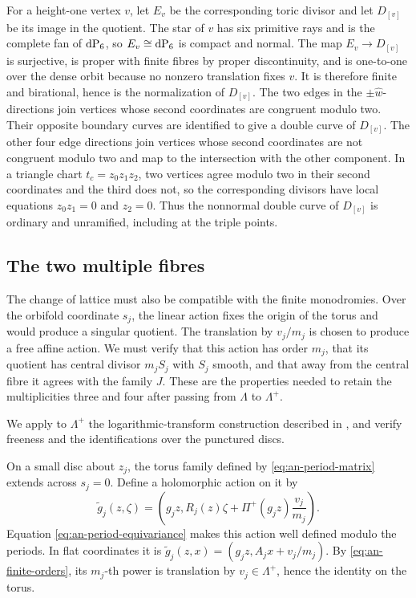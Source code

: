 For a height-one vertex $v$, let $E_v$
be the corresponding toric divisor and let $D_{[v]}$ be its image in the
quotient.  The star of $v$ has six primitive rays and is the complete fan
of $\operatorname{dP}_6$, so $E_v\cong\operatorname{dP}_6$ is compact and normal.  The map
$E_v\to D_{[v]}$ is surjective, is proper with finite fibres by proper
discontinuity, and is one-to-one over the dense orbit because no nonzero
translation fixes $v$.  It is therefore finite and birational, hence is
the normalization of $D_{[v]}$.  The two edges in the
$\pm\widehat w$-directions join vertices whose second coordinates are
congruent modulo two.  Their opposite boundary curves are identified to give
a double curve of $D_{[v]}$.  The other four edge directions join vertices
whose second coordinates are not congruent modulo two and map to the
intersection with the other component.  In a
triangle chart $t_c=z_0z_1z_2$, two vertices agree modulo two in their
second coordinates and the third does not, so the corresponding divisors
have local equations
$z_0z_1=0$ and $z_2=0$.  Thus the nonnormal double curve of
$D_{[v]}$ is ordinary and unramified, including at the triple points.

\subsection{The two multiple fibres}

The change of lattice must also be compatible with the finite monodromies.
Over the orbifold coordinate $s_j$, the linear action fixes the origin of
the torus and would produce a singular quotient.  The translation by
$v_j/m_j$ is chosen to produce a free affine action.  We must verify that this
action has order $m_j$, that its quotient has central divisor $m_jS_j$
with $S_j$ smooth, and that away from the central fibre it agrees with the
family $J$.  These are the properties needed to retain the multiplicities
three and four after passing from $\Lambda$ to $\Lambda^+$.

We apply to $\Lambda^+$ the logarithmic-transform construction described in
\citep[Definition~5.3 and Theorem~5.4]{Alpoge2026}, and verify freeness and
the identifications over the punctured discs.

On a small disc about $z_j$, the torus family defined by
\eqref{eq:an-period-matrix} extends across $s_j=0$.  Define a holomorphic
action on it by
\begin{equation}\label{eq:an-holomorphic-affine-action}
 \widetilde g_j(z,\zeta)
 =\left(g_jz,
 R_j(z)\zeta+\Pi^+(g_jz)\frac{v_j}{m_j}\right).
\end{equation}
Equation \eqref{eq:an-period-equivariance} makes this action well defined
modulo the periods.  In flat coordinates it is
$\widetilde g_j(z,x)=(g_jz,A_jx+v_j/m_j)$.
By \eqref{eq:an-finite-orders}, its $m_j$-th power is translation by
$v_j\in\Lambda^+$, hence the identity on the torus.

